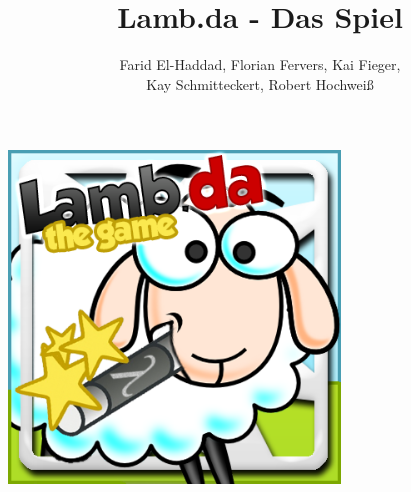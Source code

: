\documentclass[parskip=full]{scrartcl}
\title{Lamb.da - Das Spiel}
\author{ 	
Farid El-Haddad,  Florian Fervers,  Kai Fieger,
\\
Kay Schmitteckert, Robert Hochweiß
}
\begin{document}
\maketitle
	\begin{center}
	\includegraphics[width=250pt]{../gui/icon.png}
	\end{center}
	
\newpage
\tableofcontents
\newpage

\newpage

\newpage

\newpage

\newpage

\newpage

\newpage

\newpage

\newpage

\newpage

\newpage

\newage

\end{document}
